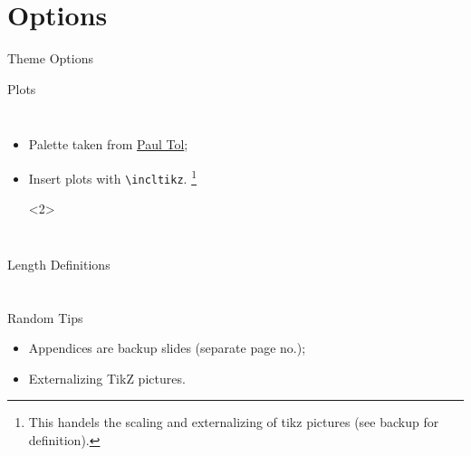 \documentclass[t]{beamer}
\begin{document}
\section{Options}
\begin{frame}{Theme Options}
\end{frame}

\begin{frame}[fragile]{Plots}
  \begin{columns}[T]
    \begin{itemize}
      \item Palette taken from \href{https://personal.sron.nl/~pault/#sec:qualitative}{Paul Tol};
      \item <2-> Insert plots with \texttt{\textbackslash{}incltikz}.%
        \footnote{This handels the scaling and externalizing of tikz pictures (see backup for definition).}%
        \begin{onlyenv}<2>
        \begin{dotlst}[title={Example plot}]
        \end{dotlst}
      \end{onlyenv}
    \end{itemize}
  \end{columns}
\end{frame}

\begin{frame}{Length Definitions}
\end{frame}

\appendix
\section*{}

\begin{frame}[fragile]{Random Tips}
\begin{itemize}
  \item Appendices are backup slides (separate page no.);
  \item Externalizing TikZ pictures.%
  \begin{dotlst}[%
    listing side comment,righthand ratio=0.35,comment={\incltikz{onsager}}
    ]
\usepackage{tikz}
\usetikzlibrary{external}
\tikzexternalize[%
  prefix=build/,only named=true]
\newcommand{\inptikz}[2][]{%
  \tikzsetnextfilename{#2}%
  \texttt{[image: tikz/\#2.tikz]}%
}
  \end{dotlst}
\end{itemize}
\end{frame}
\end{document}
